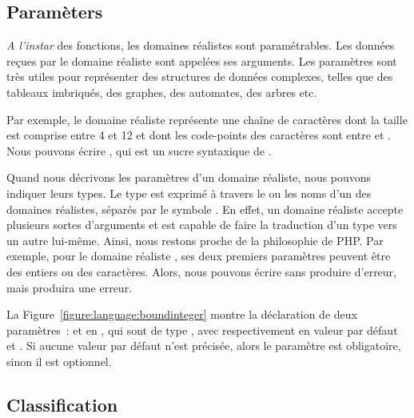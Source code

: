 \subsection{Paramèters}
\label{subsection:language:realdom:parameters}

{\em A l'instar} des fonctions, les domaines réalistes sont {\strong
paramétrables}.  Les données reçues par le domaine réaliste sont appelées ses
{\strong arguments}. Les paramètres sont très utiles pour représenter des
structures de données complexes, telles que des tableaux imbriqués, des graphes,
des automates, des arbres etc.

\begin{example}

Par exemple, le domaine réaliste 
représente une chaîne de caractères dont la taille est comprise entre 4 et 12 et
dont les code-points des caractères sont entre  et . Nous
pouvons écrire , qui est un sucre syntaxique de
.

\end{example}

Quand nous décrivons les paramètres d'un domaine réaliste, nous pouvons indiquer
leurs types. Le type est exprimé à travers le ou les noms d'un des domaines
réalistes, séparés par le symbole \code{$\vert$}. En effet, un domaine réaliste
accepte plusieurs sortes d'arguments et est capable de faire la traduction d'un
type vers un autre lui-même. Ainsi, nous restons proche de la philosophie de
PHP. Par exemple, pour le domaine réaliste , ses deux premiers
paramètres peuvent être des entiers ou des caractères. Alors, nous pouvons
écrire  sans produire d'erreur, mais
 produira une erreur.

La Figure~\ref{figure:language:boundinteger} montre la déclaration de deux
paramètres~:  et  en , qui sont de type
, avec respectivement en valeur par défaut
 et . Si aucune valeur par défaut n'est
précisée, alors le paramètre est {\strong obligatoire}, sinon il est {\strong
optionnel}.

\subsection{Classification}
\label{subsection:language:realdom:classification}


